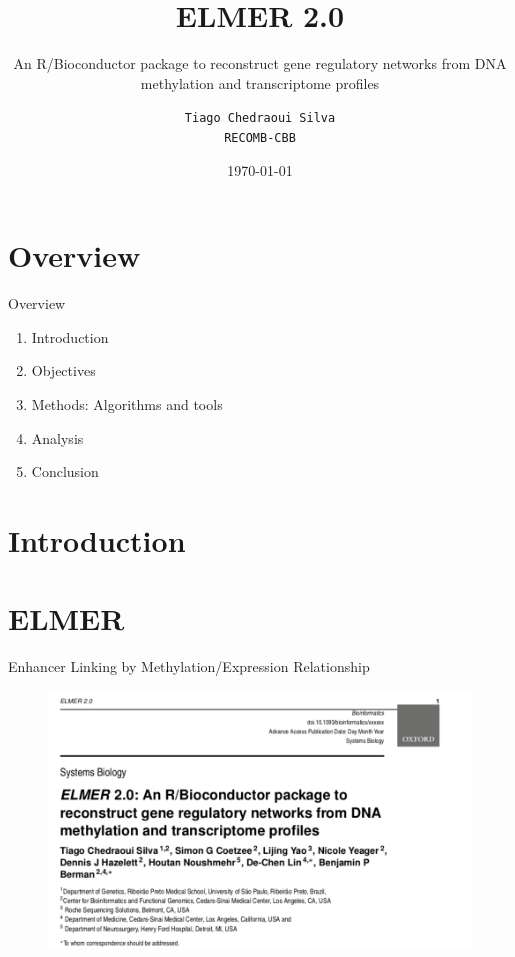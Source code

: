 \documentclass[slidestop,compress,11pt,xcolor=dvipsnames]{beamer}
\title{ELMER 2.0}
\subtitle{An R/Bioconductor package to reconstruct gene regulatory networks from DNA methylation and transcriptome profiles}
\date{\today}
\author[Tiago Chedraoui Silva]{\texttt {Tiago Chedraoui Silva}\\ \texttt{RECOMB-CBB}} %
\institute{University of São Paulo / Cedar-Sinai }
\begin{document}
%
%

{
\maketitle
}


\section*{Overview}
\begin{frame}{Overview}
\begin{enumerate}
\setlength\itemsep{2em}
\item Introduction
\item Objectives
\item Methods: Algorithms and tools
\item Analysis
\item Conclusion
\end{enumerate}
\end{frame}


%
%

\section{Introduction}

\section{ELMER}

\begin{frame}{ Enhancer Linking by Methylation/Expression Relationship}
 \vspace*{-0.5cm}
 \begin{figure}
  \centering
  \includegraphics[width=1.0\linewidth]{bioinformatics.png}
 \end{figure}
\end{frame}
\end{document}
